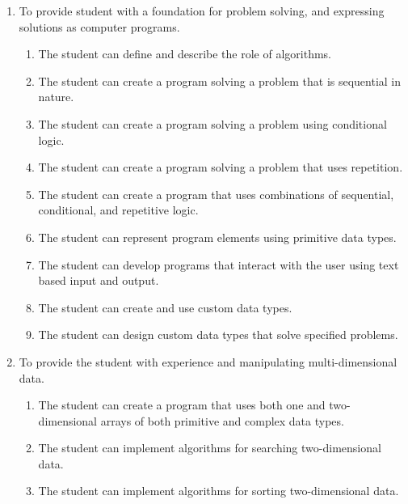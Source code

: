 \documentclass[10pt]{article}
\begin{document}
\begin{enumerate}
\begin{enumerate}
	\end{enumerate}
	\item To provide student with a foundation for problem solving, and expressing solutions as computer programs.
	\begin{enumerate}
		\item The student can define and describe the role of algorithms.
		\item The student can create a program solving a problem that is sequential in nature.
		\item The student can create a program solving a problem using conditional logic.
		\item The student can create a program solving a problem that uses repetition.
		\item The student can create a program that uses combinations of sequential, conditional, and repetitive logic.
		\item The student can represent program elements using primitive data types.
		\item The student can develop programs that interact with the user using text based input and output.
		\item The student can create and use custom data types.
		\item The student can design custom data types that solve specified problems.
	\end{enumerate}
	\item To provide the student with experience and manipulating multi-dimensional data.
	\begin{enumerate}
		\item The student can create a program that uses both one and two-dimensional arrays of both primitive and complex data types.
		\item The student can implement algorithms for searching two-dimensional data.
		\item The student can implement algorithms for sorting two-dimensional data.
	\end{enumerate}
\end{enumerate}


\end{document}
